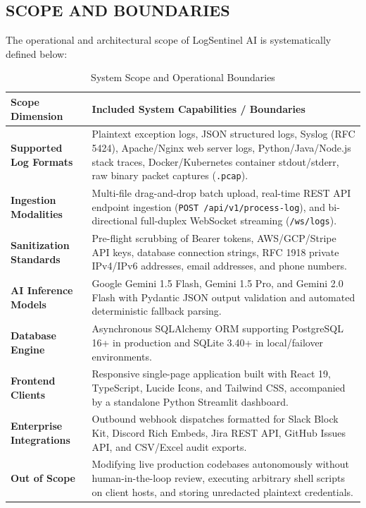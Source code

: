 \documentclass[12pt,a4paper]{article}
\begin{document}
\clearpage
\subsection{SCOPE AND BOUNDARIES}
The operational and architectural scope of LogSentinel AI is systematically defined below:

\begin{table}[H]
\centering
\caption{System Scope and Operational Boundaries}
\label{tab:system_scope}
\renewcommand{\arraystretch}{1.3}
\begin{tabularx}{\textwidth}{|>{\raggedright\arraybackslash}p{3.8cm}|>{\raggedright\arraybackslash}X|}
\hline
\textbf{Scope Dimension} & \textbf{Included System Capabilities / Boundaries} \\
\hline
\textbf{Supported Log Formats} & Plaintext exception logs, JSON structured logs, Syslog (RFC 5424), Apache/Nginx web server logs, Python/Java/Node.js stack traces, Docker/Kubernetes container stdout/stderr, raw binary packet captures (\texttt{.pcap}). \\
\hline
\textbf{Ingestion Modalities} & Multi-file drag-and-drop batch upload, real-time REST API endpoint ingestion (\texttt{POST /api/v1/process-log}), and bi-directional full-duplex WebSocket streaming (\texttt{/ws/logs}). \\
\hline
\textbf{Sanitization Standards} & Pre-flight scrubbing of Bearer tokens, AWS/GCP/Stripe API keys, database connection strings, RFC 1918 private IPv4/IPv6 addresses, email addresses, and phone numbers. \\
\hline
\textbf{AI Inference Models} & Google Gemini 1.5 Flash, Gemini 1.5 Pro, and Gemini 2.0 Flash with Pydantic JSON output validation and automated deterministic fallback parsing. \\
\hline
\textbf{Database Engine} & Asynchronous SQLAlchemy ORM supporting PostgreSQL 16+ in production and SQLite 3.40+ in local/failover environments. \\
\hline
\textbf{Frontend Clients} & Responsive single-page application built with React 19, TypeScript, Lucide Icons, and Tailwind CSS, accompanied by a standalone Python Streamlit dashboard. \\
\hline
\textbf{Enterprise Integrations} & Outbound webhook dispatches formatted for Slack Block Kit, Discord Rich Embeds, Jira REST API, GitHub Issues API, and CSV/Excel audit exports. \\
\hline
\textbf{Out of Scope} & Modifying live production codebases autonomously without human-in-the-loop review, executing arbitrary shell scripts on client hosts, and storing unredacted plaintext credentials. \\
\hline
\end{tabularx}
\end{table}
\end{document}
